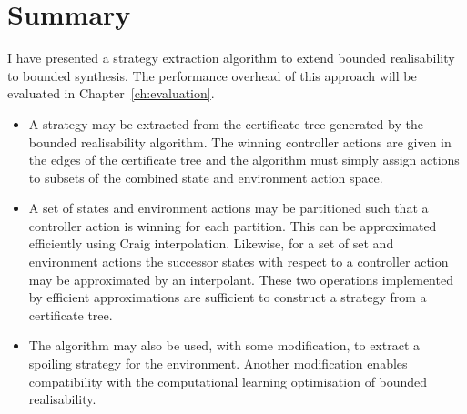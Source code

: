 \section{Summary}


I have presented a strategy extraction algorithm to extend bounded realisability to bounded synthesis. The performance overhead of this approach will be evaluated in Chapter~\ref{ch:evaluation}.

\begin{itemize}
    \item A strategy may be extracted from the certificate tree generated by the bounded realisability algorithm. The winning controller actions are given in the edges of the certificate tree and the algorithm must simply assign actions to subsets of the combined state and environment action space.

    \item A set of states and environment actions may be partitioned such that a controller action is winning for each partition. This can be approximated efficiently using Craig interpolation.  Likewise, for a set of set and environment actions the successor states with respect to a controller action may be approximated by an interpolant. These two operations implemented by efficient approximations are sufficient to construct a strategy from a certificate tree.

    \item The algorithm may also be used, with some modification, to extract a spoiling strategy for the environment. Another modification enables compatibility with the computational learning optimisation of bounded realisability.

\end{itemize}
